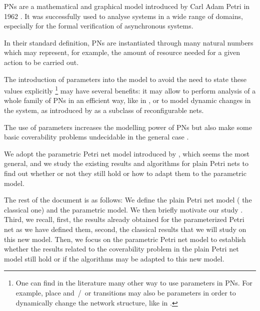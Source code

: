 \acp{PN} are a mathematical and graphical model introduced by Carl Adam Petri in 1962 \cite{Petri62}. It was successfully used to analyse systems in a wide range of domains, especially for the formal verification of asynchronous systems.

In their standard definition, \acp{PN} are instantiated through many natural numbers which may represent, for example, the amount of resource needed for a given action to be carried out.

The introduction of parameters into the model to avoid the need to state these values explicitly%
\footnote{One can find in the literature many other way to use parameters in \acp{PN}. For example, place and~/~or transitions may also be parameters in order to dynamically change the network structure, like in \cite{Christensen97}.}
may have several benefits:
it may allow to perform analysis of a whole family of \acp{PN} in an efficient way, like in \cite{Abdulla13}, or to model dynamic changes in the system, as introduced by \cite{Badouel99} as a subclass of reconfigurable nets.

The use of parameters increases the modelling power of \acp{PN} but also make some basic coverability problems undecidable in the general case \cite{David17}.

We adopt the parametric Petri net model introduced by \cite{David17}, which seems the most general, and we study the existing results and algorithms for plain Petri nets to find out whether or not they still hold or how to adapt them to the parametric model.

The rest of the document is as follows:
We define the plain Petri net model ( the classical one) and the parametric model.
We then briefly motivate our study .
Third, we recall, first, the results already obtained for the parameterized Petri net as we have defined them, second, the classical results that we will study on this new model.
Then, we focus on the parametric Petri net model to establish whether the results related to the coverability problem in the plain Petri net model still hold or if the algorithms may be adapted to this new model.

